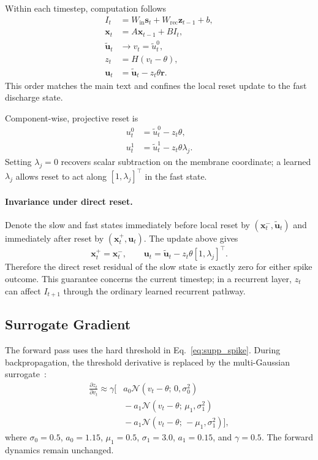 \documentclass[letterpaper]{article}
\begin{document}
Within each timestep, computation follows
\begin{align*}
I_t &= W_{\mathrm{in}}\mathbf{s}_t+W_{\mathrm{rec}}\mathbf{z}_{t-1}+b, \\
\mathbf{x}_t &= A\mathbf{x}_{t-1}+BI_t, \\
\widetilde{\mathbf{u}}_t &\to v_t=\widetilde{u}_t^0, \\
z_t &= H(v_t-\theta), \\
\mathbf{u}_t &= \widetilde{\mathbf{u}}_t-z_t\theta\mathbf{r}.
\end{align*}
This order matches the main text and confines the local reset update to the fast discharge state.

Component-wise, projective reset is
\begin{align}
u_t^0 &= \widetilde{u}_t^0 - z_t\theta, \\
u_t^1 &= \widetilde{u}_t^1 - z_t\theta\lambda_j.
\end{align}
Setting $\lambda_j=0$ recovers scalar subtraction on the membrane coordinate; a learned $\lambda_j$ allows reset to act along $[1,\lambda_j]^\top$ in the fast state.

\paragraph{Invariance under direct reset.}
Denote the slow and fast states immediately before local reset by $(\mathbf{x}_t^{-},\widetilde{\mathbf{u}}_t)$ and immediately after reset by $(\mathbf{x}_t^{+},\mathbf{u}_t)$. The update above gives
\begin{equation}
\mathbf{x}_t^{+}=\mathbf{x}_t^{-},\qquad
\mathbf{u}_t=\widetilde{\mathbf{u}}_t-z_t\theta[1,\lambda_j]^\top.
\label{eq:supp_direct_reset_invariance}
\end{equation}
Therefore the direct reset residual of the slow state is exactly zero for either spike outcome. This guarantee concerns the current timestep; in a recurrent layer, $z_t$ can affect $I_{t+1}$ through the ordinary learned recurrent pathway.

\subsection{Surrogate Gradient}
\label{supp:sec:surrogate}

The forward pass uses the hard threshold in Eq.~\eqref{eq:supp_spike}. During backpropagation, the threshold derivative is replaced by the multi-Gaussian surrogate~\cite{asrnn}:
\begin{equation}
\begin{aligned}
\frac{\partial z_t}{\partial v_t} \approx \gamma\big[&
a_0 \mathcal{N}(v_t-\theta;\,0,\sigma_0^2) \\
&{}-a_1\mathcal{N}(v_t-\theta;\,\mu_1,\sigma_1^2) \\
&{}-a_1\mathcal{N}(v_t-\theta;\,-\mu_1,\sigma_1^2)\big],
\end{aligned}
\label{eq:supp_surrogate}
\end{equation}
where $\sigma_0=0.5$, $a_0=1.15$, $\mu_1=0.5$, $\sigma_1=3.0$, $a_1=0.15$, and $\gamma=0.5$. The forward dynamics remain unchanged.
\end{document}
